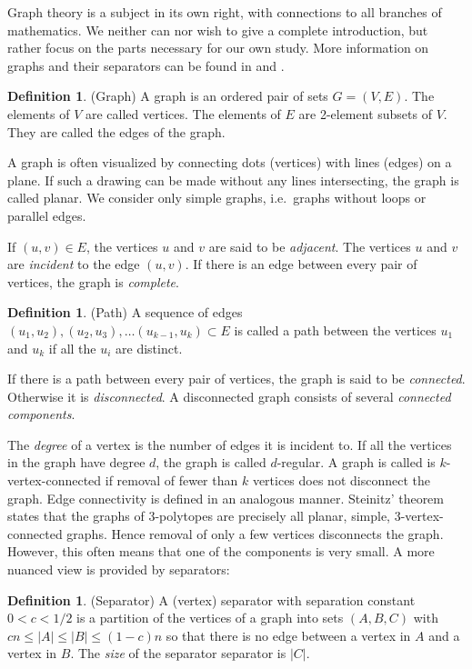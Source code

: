 \documentclass[a4paper,12pt]{book}
\theoremstyle{plain}
\theoremstyle{definition}
\newtheorem{definition}[theorem]{Definition}
\begin{document}
Graph theory is a subject in its own right, with connections to all branches 
of mathematics. We neither can nor wish to give a complete introduction, but
rather focus on the parts necessary for our own study. More information on graphs
and their separators can be found in \cite{spectra} and \cite{Rama}.

\begin{definition}
(Graph) A graph is an ordered pair of sets $G=(V,E)$. The elements of $V$ are called 
vertices. The elements of $E$ are 2-element subsets of $V$. They are called 
the edges of the graph. 
\end{definition}
A graph is often visualized by connecting dots (vertices) with lines (edges) on a plane. 
If such a drawing can be made without any lines intersecting, the graph is called
planar.
We consider only simple graphs, i.e.\ graphs without loops or parallel 
edges.

If $(u,v) \in E$, the vertices $u$ and $v$ are said to be \textit{adjacent}. 
The vertices $u$ and $v$ are \textit{incident} to the edge $(u,v)$. If there is an edge
between every pair of vertices, the graph is \textit{complete}.
\begin{definition}
 (Path) A sequence of edges $(u_1, u_2), (u_2, u_3), \dots (u_{k-1}, u_k) \subset E$ 
is called a path between the vertices $u_1$ and $u_k$ if all the $u_i$ are 
distinct.
\end{definition}
If there is a path between every pair of vertices, the graph is said to be 
\textit{connected}. Otherwise it is \textit{disconnected}. A disconnected graph 
consists of several \textit{connected components}.


The \textit{degree} of a vertex is the number of edges it is incident to. 
If all the vertices in the graph have degree $d$, the graph is called 
$d$-regular. A graph is called is $k$-vertex-connected if removal of fewer than 
$k$ vertices does not disconnect the graph. Edge connectivity is defined in an 
analogous manner. Steinitz' theorem states that the graphs of 
3-polytopes are precisely all planar, simple, 3-vertex-connected graphs. Hence 
removal of only a few vertices disconnects the graph. However, this
often means that one of the components is very small. A more nuanced view is 
provided 
by separators:

\begin{definition}
(Separator) A (vertex) separator with separation constant $0<c<1/2$ is a 
partition of the vertices of a graph into 
sets $(A,B,C)$  with $cn \le |A| \le |B| \le (1-c)n$ so that there is no edge between 
a vertex in $A$ and a vertex in $B$. The \textit{size} of the separator
separator is $|C|$.  
\end{definition}
\end{document}
